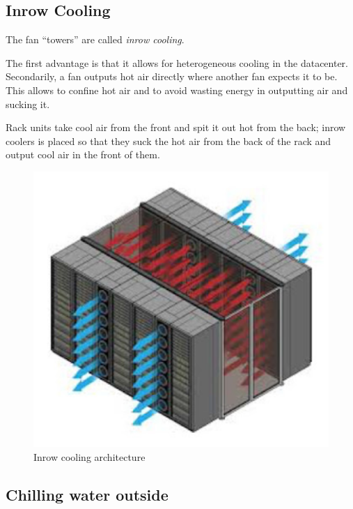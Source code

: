 \subsection{Inrow Cooling}
\begin{paracol}{2}
   \colfill
   The fan ``towers'' are called \textit{inrow cooling}.

   The first advantage is that it allows for heterogeneous cooling in the datacenter.
   Secondarily, a fan outputs hot air directly where another fan expects it to be.
   This allows to confine hot air and to avoid wasting energy in outputting air and sucking it.

   Rack units take cool air from the front and spit it out hot from the back; inrow coolers is placed so that they suck the hot air from the back of the rack and output cool air in the front of them. 


   \colfill
   \switchcolumn
\begin{figure}[htbp]
   \centering
   \includegraphics{images/inrow_cooling.png}
   \caption{Inrow cooling architecture}
   \label{fig:inrow_cooling}
\end{figure}
\end{paracol}

\subsection{Chilling water outside}


